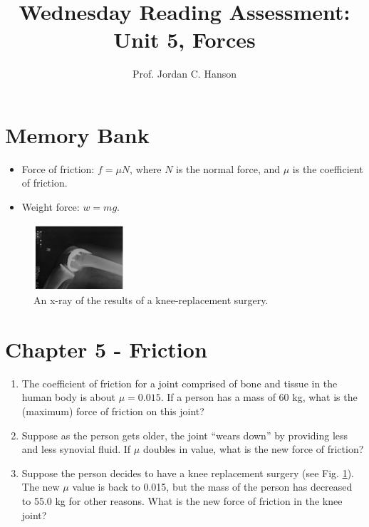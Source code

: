 \documentclass{article}
\begin{document}
\title{Wednesday Reading Assessment: Unit 5, Forces}
\author{Prof. Jordan C. Hanson}

\maketitle

\section{Memory Bank}

\begin{itemize}
\item Force of friction: $f = \mu N$, where $N$ is the normal force, and $\mu$ is the coefficient of friction.
\item Weight force: $w = mg$.
\end{itemize}
\begin{figure}[ht]
\centering
\includegraphics[width=0.3\textwidth]{bone.png}
\caption{\label{fig:bone} An x-ray of the results of a knee-replacement surgery.}
\end{figure}
\section{Chapter 5 - Friction}
\begin{enumerate}
\item The coefficient of friction for a joint comprised of bone and tissue in the human body is about $\mu = 0.015$.  If a person has a mass of 60 kg, what is the (maximum) force of friction on this joint? \\ \vspace{2cm}
\item Suppose as the person gets older, the joint ``wears down'' by providing less and less synovial fluid.  If $\mu$ doubles in value, what is the new force of friction? \\ \vspace{2cm}
\item Suppose the person decides to have a knee replacement surgery (see Fig. \ref{fig:bone}).  The new $\mu$ value is back to 0.015, but the mass of the person has decreased to 55.0 kg for other reasons.  What is the new force of friction in the knee joint?
\end{enumerate}
\end{document}
